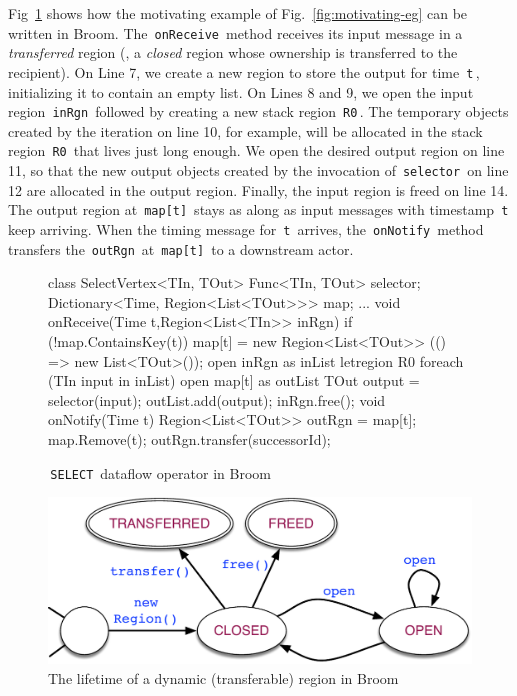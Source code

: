 \documentclass[a4paper,UKenglish]{lipics-v2018}
\newcommand{\C}[1]{\code{#1}}
\newcommand{\code}[1]{\,{\tt #1}\,}
\newcommand{\name}{{\sc Broom}\xspace}
\begin{document}
Fig~\ref{fig:motivating-eg-in-broom} shows how the motivating example
of Fig.~\ref{fig:motivating-eg} can be written in \name. The
\C{onReceive} method receives its input message in a
\emph{transferred} region (\ie, a \emph{closed} region whose ownership
is transferred to the recipient). On Line 7, we create a new region to
store the output for time \C{t}, initializing it to contain an empty
list. On Lines 8 and 9, we open the input region \C{inRgn} followed by
creating a new stack region \C{R0}. The temporary objects created by
the iteration on line 10, for example, will be allocated in the stack
region \C{R0} that lives just long enough.  We open the desired output
region on line 11, so that the new output objects created by the
invocation of \C{selector} on line 12 are allocated in the output
region.  Finally, the input region is freed on line 14. The output
region at \C{map[t]} stays as along as input messages with timestamp
\C{t} keep arriving. When the timing message for \C{t} arrives, the
\C{onNotify} method transfers the \C{outRgn} at \C{map[t]} to a
downstream actor.

\begin{figure}[t!]
\begin{numcodejava}
class SelectVertex<TIn, TOut> {
  Func<TIn, TOut> selector;
  Dictionary<Time, Region<List<TOut>>> map;
  ...
  void onReceive(Time t,Region<List<TIn>> inRgn){
    if (!map.ContainsKey(t))
       map[t] = new Region<List<TOut>> (() => new List<TOut>());
    open inRgn as inList {
      letregion R0 {
        foreach (TIn input in inList) {
          open map[t] as outList {
            TOut output = selector(input);
            outList.add(output); } } } }
    inRgn.free();
  }
  void onNotify(Time t) {
     Region<List<TOut>> outRgn = map[t];
     map.Remove(t);
     outRgn.transfer(successorId);
  }
}
\end{numcodejava}
\caption{\C{SELECT} dataflow operator in \name}
\label{fig:motivating-eg-in-broom}
\vspace*{-0.15in}
\end{figure}

\begin{figure} 
\includegraphics[scale=0.45]{region-fsm}
\caption{The lifetime of a dynamic (transferable) region in \name}
\label{fig:region-fsm} 
\vspace*{-0.1in} 
\end{figure}
\end{document}
